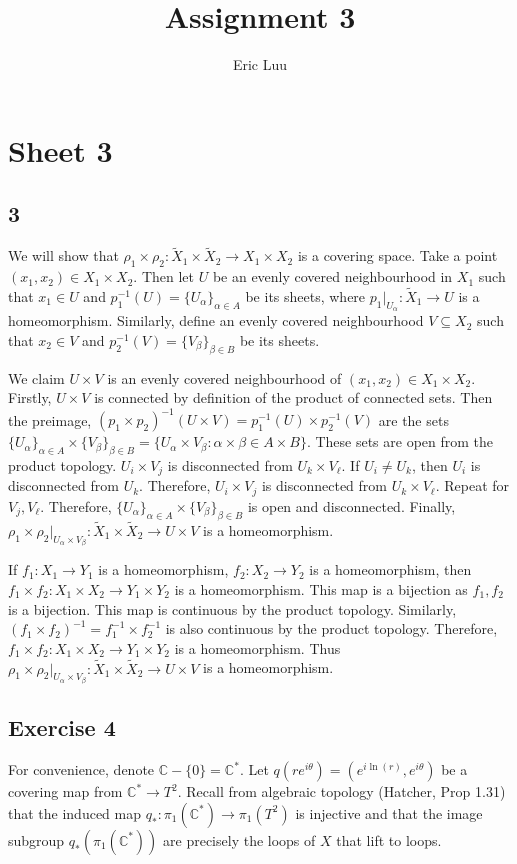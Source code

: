 \documentclass{article}
\title{Assignment 3}
\author{Eric Luu}
\theoremstyle{definition}
\numberwithin{theorem}{section}
\numberwithin{equation}{section}
\newcommand{\cover}{\widetilde{X}}
\begin{document}
\section{Sheet 3}
\subsection{3}
We will show that $\rho_1 \times \rho_2: \cover_1 \times \cover_2 \rightarrow X_1 \times X_2$ is a covering space. 
Take a point $(x_1, x_2) \in X_1 \times X_2$. Then let $U$ be an evenly covered neighbourhood in $X_1$ such that $x_1 \in U$ and $p_1^{-1}(U) = \{U_\alpha \}_{\alpha \in A}$ be its sheets, where $p_1|_{U_\alpha}: \cover_1 \rightarrow U$ is a homeomorphism. Similarly, define an evenly covered neighbourhood $V \subseteq X_2$ such that $x_2 \in V$ and $p_2^{-1}(V) = \{V_\beta \}_{\beta \in B}$ be its sheets. 

We claim $U \times V$ is an evenly covered neighbourhood of $(x_1, x_2) \in X_1 \times X_2$. Firstly, $U \times V$ is connected by definition of the product of connected sets. Then the preimage, $(p_1 \times p_2)^{-1}(U \times V) = p_1^{-1}(U) \times p_2^{-1}(V)$ are the sets $\{U_\alpha \}_{\alpha \in A} \times \{V_\beta \}_{\beta \in B} = \{U_\alpha \times V_\beta : \alpha \times \beta \in A \times B\}$. These sets are open from the product topology. $U_i \times V_j$ is disconnected from $U_k \times V_\ell$. If $U_i \neq U_k$, then $U_i$ is disconnected from $U_k$. Therefore, $U_i \times V_j$ is disconnected from $U_k \times V_\ell$. Repeat for $V_j, V_\ell$. Therefore, $\{U_\alpha \}_{\alpha \in A} \times \{V_\beta \}_{\beta \in B} $ is open and disconnected.
Finally, $\rho_1 \times \rho_2 |_{U_\alpha \times V_\beta}: \cover_1 \times \cover_2 \rightarrow U \times V$ is a homeomorphism. 

If $f_1 : X_1 \rightarrow Y_1$ is a homeomorphism, $f_2 : X_2 \rightarrow Y_2$ is a homeomorphism, then $f_1 \times f_2 : X_1 \times X_2 \rightarrow Y_1 \times Y_2$ is a homeomorphism. This map is a bijection as $f_1, f_2$ is a bijection. This map is continuous by the product topology. Similarly,$(f_1 \times f_2 )^{-1} = f_1^{-1} \times f_2^{-1}$ is also continuous by the product topology. Therefore, $f_1 \times f_2 : X_1 \times X_2 \rightarrow Y_1 \times Y_2$ is a homeomorphism. Thus $\rho_1 \times \rho_2 |_{U_\alpha \times V_\beta}: \cover_1 \times \cover_2 \rightarrow U \times V$ is a homeomorphism. 

\subsection{Exercise 4}
For convenience, denote $\mathbb{C} - \{0\} = \mathbb{C}^*$. 
Let $q(r e^{i \theta}) = (e^{i \ln(r)}, e^{i \theta})$ be a covering map from $\mathbb{C}^* \rightarrow T^2$. Recall from algebraic topology (Hatcher, Prop 1.31) that the induced map $q_* : \pi_1(\mathbb{C}^*) \rightarrow \pi_1(T^2)$ is injective and that the image subgroup $q_*(\pi_1(\mathbb{C}^*))$ are precisely the loops of $X$ that lift to loops. 
\end{document}
